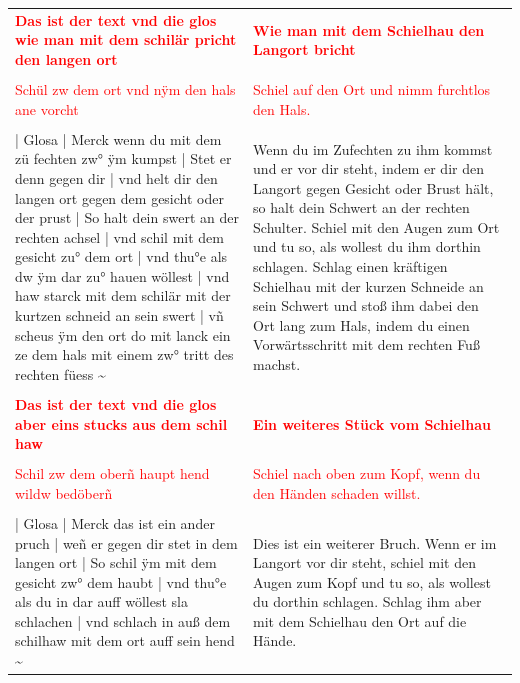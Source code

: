 \begin{center}
\end{center}

\newpage

\begin{longtable}{p{6.25cm}p{6.25cm}}
\textbf{\textcolor{red}{Das ist der text vnd die glos wie man mit dem schilär pricht den langen ort}}
&
\textbf{\textcolor{red}{Wie man mit dem Schielhau den Langort bricht}}
\\
\\
\textcolor{red}{Schül zw dem ort vnd nÿm den hals ane vorcht}
&
\textcolor{red}{Schiel auf den Ort und nimm furchtlos den Hals.}
\\
\\
| Glosa | Merck wenn du mit dem zü fechten zw° ÿm kumpst | Stet er denn gegen dir | vnd helt dir den langen ort gegen dem gesicht oder der prust | So halt dein swert an der rechten achsel | vnd schil mit dem gesicht zu° dem ort | vnd thu°e als dw ÿm dar zu° hauen wöllest | vnd haw starck mit dem schilär mit der kurtzen schneid an sein swert | vñ scheus ÿm den ort do mit lanck ein ze dem hals mit einem zw° tritt des rechten füess \textasciitilde 
&
Wenn du im Zufechten zu ihm kommst und er vor dir steht, indem er dir den Langort gegen Gesicht oder Brust hält, so halt dein Schwert an der rechten Schulter. Schiel mit den Augen zum Ort und tu so, als wollest du ihm dorthin schlagen. Schlag einen kräftigen Schielhau mit der kurzen Schneide an sein Schwert und stoß ihm dabei den Ort lang zum Hals, indem du einen Vorwärtsschritt mit dem rechten Fuß machst.
\\
\\
\textbf{\textcolor{red}{Das ist der text vnd die glos aber eins stucks aus dem schil haw}}
&
\textbf{\textcolor{red}{Ein weiteres Stück vom Schielhau}}
\\
\\
\textcolor{red}{Schil zw dem oberñ haupt hend wildw bedöberñ}
&
\textcolor{red}{Schiel nach oben zum Kopf, wenn du den Händen schaden willst.}
\\
\\
| Glosa | Merck das ist ein ander pruch | weñ er gegen dir stet in dem langen ort | So schil ÿm mit dem gesicht zw° dem haubt | vnd thu°e als du in dar auff wöllest sla schlachen | vnd schlach in auß dem schilhaw mit dem ort auff sein hend \textasciitilde 
&
Dies ist ein weiterer Bruch. Wenn er im Langort vor dir steht, schiel mit den Augen zum Kopf und tu so, als wollest du dorthin schlagen. Schlag ihm aber mit dem Schielhau den Ort auf die Hände.
\end{longtable}

